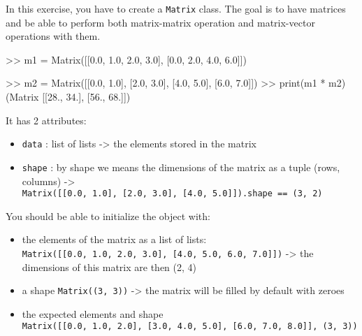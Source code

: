 \documentclass[]{article}
\newenvironment{Shaded}{\begin{snugshade}}{\end{snugshade}}
\newcommand{\BuiltInTok}[1]{\textcolor[rgb]{0.50,0.55,0.55}{#1}}
\newcommand{\FloatTok}[1]{\textcolor[rgb]{0.96,0.45,0.00}{#1}}
\newcommand{\NormalTok}[1]{\textcolor[rgb]{0.81,0.81,0.76}{#1}}
\newcommand{\OperatorTok}[1]{\textcolor[rgb]{0.81,0.81,0.76}{#1}}
\begin{document}
In this exercise, you have to create a \texttt{Matrix} class. The goal
is to have matrices and be able to perform both matrix-matrix operation
and matrix-vector operations with them.

\begin{Shaded}
\begin{Highlighting}[]
\OperatorTok{>>}\NormalTok{ m1 }\OperatorTok{=}\NormalTok{ Matrix([[}\FloatTok{0.0}\NormalTok{, }\FloatTok{1.0}\NormalTok{, }\FloatTok{2.0}\NormalTok{, }\FloatTok{3.0}\NormalTok{], }
\NormalTok{                [}\FloatTok{0.0}\NormalTok{, }\FloatTok{2.0}\NormalTok{, }\FloatTok{4.0}\NormalTok{, }\FloatTok{6.0}\NormalTok{]])}

\OperatorTok{>>}\NormalTok{ m2 }\OperatorTok{=}\NormalTok{ Matrix([[}\FloatTok{0.0}\NormalTok{, }\FloatTok{1.0}\NormalTok{],}
\NormalTok{                [}\FloatTok{2.0}\NormalTok{, }\FloatTok{3.0}\NormalTok{],}
\NormalTok{                [}\FloatTok{4.0}\NormalTok{, }\FloatTok{5.0}\NormalTok{],}
\NormalTok{                [}\FloatTok{6.0}\NormalTok{, }\FloatTok{7.0}\NormalTok{]])}
\OperatorTok{>>} \BuiltInTok{print}\NormalTok{(m1 }\OperatorTok{*}\NormalTok{ m2)}
\NormalTok{(Matrix [[}\FloatTok{28.}\NormalTok{, }\FloatTok{34.}\NormalTok{], [}\FloatTok{56.}\NormalTok{, }\FloatTok{68.}\NormalTok{]])}
\end{Highlighting}
\end{Shaded}

It has 2 attributes:

\begin{itemize}
\item
  \texttt{data} : list of lists -\textgreater{} the elements stored in
  the matrix
\item
  \texttt{shape} : by shape we means the dimensions of the matrix as a
  tuple (rows, columns) -\textgreater{}
  \texttt{Matrix({[}{[}0.0,\ 1.0{]},\ {[}2.0,\ 3.0{]},\ {[}4.0,\ 5.0{]}{]}).shape\ ==\ (3,\ 2)}
\end{itemize}

You should be able to initialize the object with:

\begin{itemize}
\item
  the elements of the matrix as a list of lists:
  \texttt{Matrix({[}{[}0.0,\ 1.0,\ 2.0,\ 3.0{]},\ {[}4.0,\ 5.0,\ 6.0,\ 7.0{]}{]})}
  -\textgreater{} the dimensions of this matrix are then (2, 4)
\item
  a shape \texttt{Matrix((3,\ 3))} -\textgreater{} the matrix will be
  filled by default with zeroes
\item
  the expected elements and shape
  \texttt{Matrix({[}{[}0.0,\ 1.0,\ 2.0{]},\ {[}3.0,\ 4.0,\ 5.0{]},\ {[}6.0,\ 7.0,\ 8.0{]}{]},\ (3,\ 3))}
\end{itemize}
\end{document}
